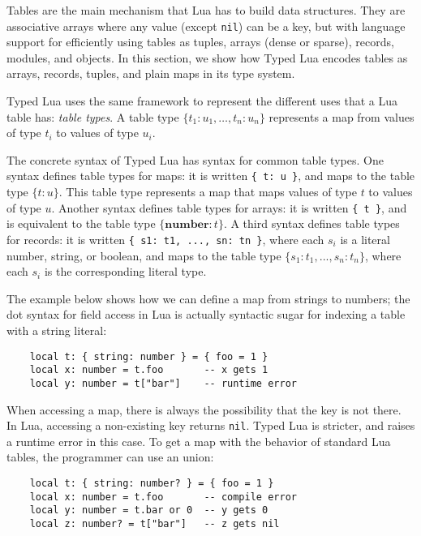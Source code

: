 \documentclass{sig-alternate}
\newcommand{\Number}{\mathbf{number}}
\begin{document}
Tables are the main mechanism that Lua has to build data
structures. They are associative arrays where any value
(except {\tt nil}) can be a key, but with language support
for efficiently using tables as tuples, arrays (dense or sparse),
records, modules, and objects. In this section,
we show how Typed Lua encodes tables as arrays, records, tuples,
and plain maps in its type system.

Typed Lua uses the same framework to represent the different
uses that a Lua table has: {\em table types}. A table type
$\{ t_{1}:u_{1}, \ldots, t_{n}:u_{n}\}$ represents a map
from values of type $t_i$ to values of type $u_i$.

The concrete syntax of Typed Lua has syntax for
common table types. One syntax defines table types for
maps: it is written \texttt{\{ t: u \}},
and maps to the table type $\{t:u\}$.
This table type represents a map that maps values of type
$t$ to values of type $u$.
Another syntax defines table types for arrays:
it is written \texttt{\{ t \}}, and is equivalent to
the table type
$\{\Number:t\}$. A third syntax defines
table types for records:
it is written \texttt{\{ s1: t1, ..., sn: tn \}}, where
each $s_i$ is a literal number, string, or boolean, 
and maps to the table type $\{s_{1}:t_{1}, ..., s_{n}:t_{n}\}$,
where each $s_i$ is the corresponding literal type.

The example below shows how we can define a map from
strings to numbers; the dot syntax for field access
in Lua is actually syntactic sugar for indexing a table
with a string literal:

\begin{verbatim}
    local t: { string: number } = { foo = 1 }
    local x: number = t.foo       -- x gets 1
    local y: number = t["bar"]    -- runtime error
\end{verbatim}

When accessing a map, there is always the possibility that
the key is not there. In Lua, accessing a non-existing key
returns {\tt nil}. Typed Lua is stricter, and raises a runtime
error in this case. To get a map with the behavior of standard
Lua tables, the programmer can use an union:

\begin{verbatim}
    local t: { string: number? } = { foo = 1 }
    local x: number = t.foo       -- compile error
    local y: number = t.bar or 0  -- y gets 0
    local z: number? = t["bar"]   -- z gets nil
\end{verbatim}
\end{document}

